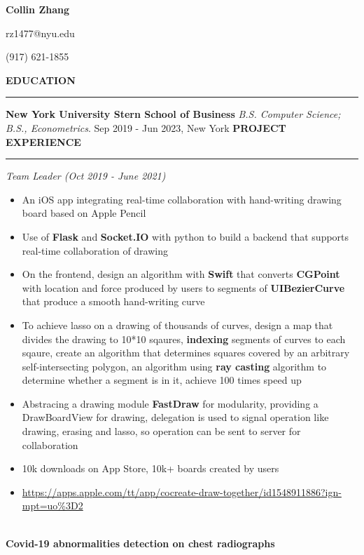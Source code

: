 \documentclass{article}
\begin{document}
\begin{center}
{\huge \textbf{Collin Zhang}}\par
rz1477@nyu.edu\par(917) 621-1855
\end{center}

\noindent
{\textbf{EDUCATION}}\newline
\rule{\textwidth}{1pt}
{\textbf {New York University Stern School of Business}}\newline
\emph {B.S. Computer Science; B.S., Econometrics}.\newline
{Sep 2019 - Jun 2023, New York}\newline
\newline
\noindent
{\textbf{PROJECT EXPERIENCE}}\newline
\rule{\textwidth}{1pt}\newline
\emph{Team Leader (Oct 2019 - June 2021)}
\begin{itemize}[leftmargin=*,topsep=0pt]
\item An iOS app integrating real-time collaboration with hand-writing drawing board based on Apple Pencil
\item Use of \textbf{Flask} and \textbf{Socket.IO} with python to build a backend that supports real-time collaboration of drawing
\item On the frontend, design an algorithm with \textbf{Swift} that converts \textbf{CGPoint} with location and force produced by users to segments of \textbf{UIBezierCurve} that produce a smooth hand-writing curve
\item To achieve lasso on a drawing of thousands of curves, design a map that divides the drawing to 10*10 sqaures, \textbf{indexing} segments of curves to each sqaure, create an algorithm that determines squares covered by an arbitrary self-intersecting polygon, an algorithm using \textbf{ray casting} algorithm to determine whether a segment is in it, achieve 100 times speed up
\item Abstracing a drawing module \textbf{FastDraw} for modularity, providing a DrawBoardView for drawing, delegation is used to signal operation like drawing, erasing and lasso, so operation can be sent to server for collaboration
\item 10k downloads on App Store, 10k+ boards created by users
\item \url{https://apps.apple.com/tt/app/cocreate-draw-together/id1548911886?ign-mpt=uo%3D2}

\end{itemize} \ \\ {\textbf{Covid-19 abnormalities detection on chest radiographs}}\newline
\end{document}
